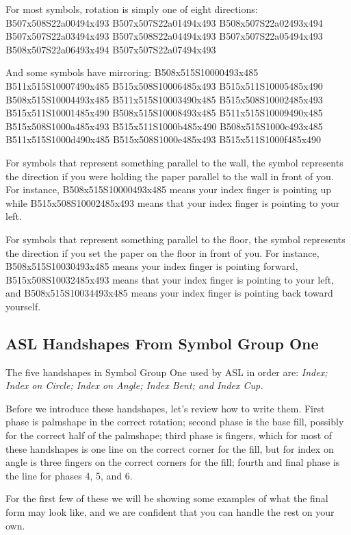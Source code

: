 \documentclass{article}
\begin{document}
For most symbols, rotation is simply one of eight directions:
B507x508S22a00494x493 B507x507S22a01494x493 B508x507S22a02493x494 B507x507S22a03494x493 B507x508S22a04494x493 B507x507S22a05494x493 B508x507S22a06493x494 B507x507S22a07494x493

And some symbols have mirroring:
B508x515S10000493x485 B511x515S10007490x485 B515x508S10006485x493 B515x511S10005485x490 B508x515S10004493x485 B511x515S10003490x485 B515x508S10002485x493 B515x511S10001485x490
B508x515S10008493x485 B511x515S10009490x485 B515x508S1000a485x493 B515x511S1000b485x490 B508x515S1000c493x485 B511x515S1000d490x485 B515x508S1000e485x493 B515x511S1000f485x490

For symbols that represent something parallel to the wall, the symbol represents the direction if you were holding the paper parallel to the wall in front of you.
For instance, {\small B508x515S10000493x485} means your index finger is pointing up while {\small B515x508S10002485x493} means that your index finger is pointing to your left.

For symbols that represent something parallel to the floor, the symbol represents the direction if you set the paper on the floor in front of you.
For instance, {\small B508x515S10030493x485} means your index finger is pointing forward, {\small B515x508S10032485x493} means that your index finger is pointing to your left, and {\small B508x515S10034493x485} means your index finger is pointing back toward yourself.

\subsection{ASL Handshapes From Symbol Group One}

The five handshapes in Symbol Group One used by ASL in order are:
{\em
Index;
Index on Circle;
Index on Angle;
Index Bent;
and Index Cup.
}

Before we introduce these handshapes, let's review how to write them.
First phase is palmshape in the correct rotation;
second phase is the base fill, possibly for the correct half of the palmshape;
third phase is fingers, which for most of these handshapes is one line on the correct corner for the fill, but for index on angle is three fingers on the correct corners for the fill;
fourth and final phase is the line for phases 4, 5, and 6.

For the first few of these we will be showing some examples of what the final form may look like, and we are confident that you can handle the rest on your own.
\end{document}
